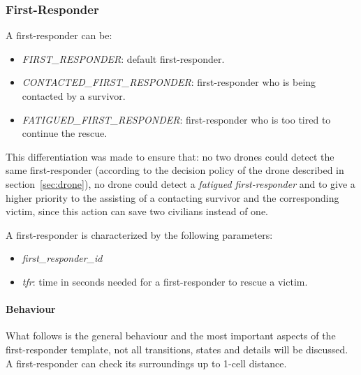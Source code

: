 \subsubsection{First-Responder}
A first-responder can be:
\begin{itemize}
	\item \textit{FIRST\_RESPONDER}: default first-responder.
	\item \textit{CONTACTED\_FIRST\_RESPONDER}: first-responder who is being contacted by a survivor.
	\item \textit{FATIGUED\_FIRST\_RESPONDER}: first-responder who is too tired to continue the rescue.
\end{itemize}

\noindent
This differentiation was made to ensure that: no two drones could detect the same first-responder (according to the decision policy of the drone described in section~\ref{sec:drone}), no drone could detect a \textit{fatigued first-responder} and to give a higher priority to the assisting of a contacting survivor and the corresponding victim, since this action can save two civilians instead of one.\newline

\noindent
A first-responder is characterized by the following parameters:
\begin{itemize}
	\item \textit{first\_responder\_id}
	\item \textit{tfr}: time in seconds needed for a first-responder to rescue a victim.
\end{itemize}

\paragraph{Behaviour}
What follows is the general behaviour and the most important aspects of the first-responder template, not all transitions, states and details will be discussed.\newline
A first-responder can check its surroundings up to 1-cell distance.

